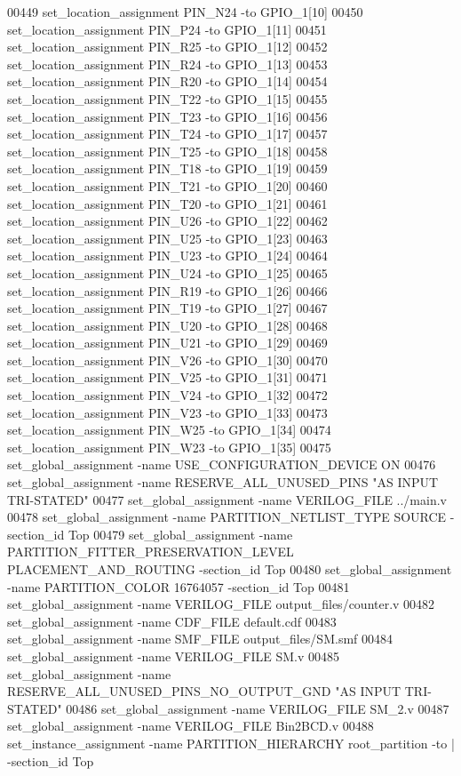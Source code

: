 \begin{DoxyCode}
00449 set\_location\_assignment PIN\_N24 -to GPIO\_1[10]
00450 set\_location\_assignment PIN\_P24 -to GPIO\_1[11]
00451 set\_location\_assignment PIN\_R25 -to GPIO\_1[12]
00452 set\_location\_assignment PIN\_R24 -to GPIO\_1[13]
00453 set\_location\_assignment PIN\_R20 -to GPIO\_1[14]
00454 set\_location\_assignment PIN\_T22 -to GPIO\_1[15]
00455 set\_location\_assignment PIN\_T23 -to GPIO\_1[16]
00456 set\_location\_assignment PIN\_T24 -to GPIO\_1[17]
00457 set\_location\_assignment PIN\_T25 -to GPIO\_1[18]
00458 set\_location\_assignment PIN\_T18 -to GPIO\_1[19]
00459 set\_location\_assignment PIN\_T21 -to GPIO\_1[20]
00460 set\_location\_assignment PIN\_T20 -to GPIO\_1[21]
00461 set\_location\_assignment PIN\_U26 -to GPIO\_1[22]
00462 set\_location\_assignment PIN\_U25 -to GPIO\_1[23]
00463 set\_location\_assignment PIN\_U23 -to GPIO\_1[24]
00464 set\_location\_assignment PIN\_U24 -to GPIO\_1[25]
00465 set\_location\_assignment PIN\_R19 -to GPIO\_1[26]
00466 set\_location\_assignment PIN\_T19 -to GPIO\_1[27]
00467 set\_location\_assignment PIN\_U20 -to GPIO\_1[28]
00468 set\_location\_assignment PIN\_U21 -to GPIO\_1[29]
00469 set\_location\_assignment PIN\_V26 -to GPIO\_1[30]
00470 set\_location\_assignment PIN\_V25 -to GPIO\_1[31]
00471 set\_location\_assignment PIN\_V24 -to GPIO\_1[32]
00472 set\_location\_assignment PIN\_V23 -to GPIO\_1[33]
00473 set\_location\_assignment PIN\_W25 -to GPIO\_1[34]
00474 set\_location\_assignment PIN\_W23 -to GPIO\_1[35]
00475 set\_global\_assignment -name USE\_CONFIGURATION\_DEVICE \textcolor{keywordflow}{ON}
00476 set\_global\_assignment -name RESERVE\_ALL\_UNUSED\_PINS "AS INPUT TRI-STATED"
00477 set\_global\_assignment -name VERILOG\_FILE ../main.v
00478 set\_global\_assignment -name PARTITION\_NETLIST\_TYPE SOURCE -section\_id Top
00479 set\_global\_assignment -name PARTITION\_FITTER\_PRESERVATION\_LEVEL PLACEMENT\_AND\_ROUTING -section\_id Top
00480 set\_global\_assignment -name PARTITION\_COLOR \textcolor{vhdllogic}{16764057} -section\_id Top
00481 set\_global\_assignment -name VERILOG\_FILE output\_files/counter.v
00482 set\_global\_assignment -name CDF\_FILE \textcolor{keywordflow}{default}.cdf
00483 set\_global\_assignment -name SMF\_FILE output\_files/SM.smf
00484 set\_global\_assignment -name VERILOG\_FILE SM.v
00485 set\_global\_assignment -name RESERVE\_ALL\_UNUSED\_PINS\_NO\_OUTPUT\_GND "AS INPUT TRI-STATED"
00486 set\_global\_assignment -name VERILOG\_FILE SM\_2.v
00487 set\_global\_assignment -name VERILOG\_FILE Bin2BCD.v
00488 set\_instance\_assignment -name PARTITION\_HIERARCHY root\_partition -to | -section\_id Top
\end{DoxyCode}
